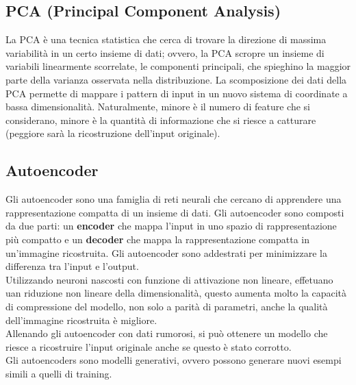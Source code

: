 \subsection{PCA (Principal Component Analysis)}

La PCA è una tecnica statistica che cerca di trovare la direzione di massima
variabilità in un certo insieme di dati; ovvero, la PCA scropre un insieme di
variabili linearmente scorrelate, le componenti principali, che spieghino la
maggior parte della varianza osservata nella distribuzione.
La scomposizione dei dati della PCA permette di mappare i pattern di input in un
nuovo sistema di coordinate a bassa dimensionalità. Naturalmente, minore è il
numero di feature che si considerano, minore è la quantità di informazione che
si riesce a catturare (peggiore sarà la ricostruzione dell'input originale).

\subsection{Autoencoder}

Gli autoencoder sono una famiglia di reti neurali che cercano di apprendere una
rappresentazione compatta di un insieme di dati. Gli autoencoder sono composti
da due parti: un \textbf{encoder} che mappa l'input in uno spazio di
rappresentazione più compatto e un \textbf{decoder} che mappa la rappresentazione
compatta in un'immagine ricostruita. Gli autoencoder sono addestrati per
minimizzare la differenza tra l'input e l'output.\\
Utilizzando neuroni nascosti con funzione di attivazione non lineare, effetuano
uan riduzione non lineare della dimensionalità, questo aumenta molto la capacità
di compressione del modello, non solo a parità di parametri, anche la qualità
dell'immagine ricostruita è migliore.\\
Allenando gli autoencoder con dati rumorosi, si può ottenere un modello che
riesce a ricostruire l'input originale anche se questo è stato corrotto.\\
Gli autoencoders sono modelli generativi, ovvero possono generare nuovi esempi
simili a quelli di training.
